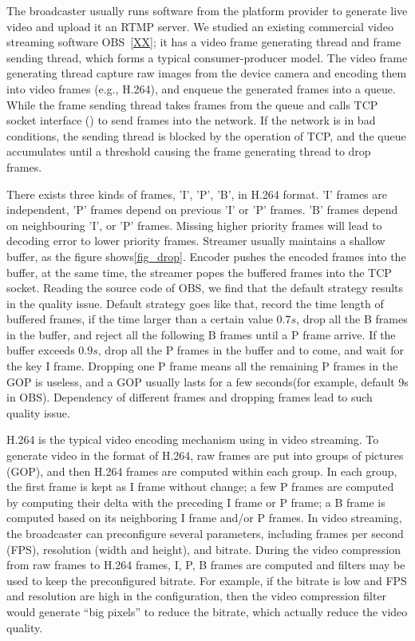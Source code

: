 \iffalse

The broadcaster usually runs software from the platform provider to generate live video and upload it an RTMP server. We studied an existing commercial video streaming software OBS~\ref{XX}; it has a video frame generating thread and frame sending thread, which forms a typical consumer-producer model. The video frame generating thread capture raw images from the device camera and encoding them into video frames (e.g., H.264), and enqueue the generated frames into a queue. While the frame sending thread takes frames from the queue and calls TCP socket interface (\mywrite) to send frames into the network. If the network is in bad conditions, the sending thread is blocked by the \mywrite operation of TCP, and the queue accumulates until a threshold causing the frame generating thread to drop frames.


There exists three kinds of frames, 'I', 'P', 'B', in H.264 format. 'I' frames are independent, 'P' frames depend on previous 'I' or 'P' frames. 'B' frames depend on neighbouring 'I', or 'P' frames. Missing higher priority frames will lead to decoding error to lower priority frames.
Streamer usually maintains a shallow buffer, as the figure shows\ref{fig_drop}. Encoder pushes the encoded frames into the buffer, at the same time, the streamer popes the buffered frames into the TCP socket. Reading the source code of OBS, we find that the default strategy results in the quality issue. Default strategy goes like that, record the time length of buffered frames, if the time larger than a certain value $0.7s$, drop all the B frames in the buffer, and reject all the following B frames until a P frame arrive. If the buffer exceeds $0.9s$, drop all the P frames in the buffer and to come, and wait for the key I frame. Dropping one P frame means all the remaining P frames in the GOP is useless, and a GOP usually lasts for a few seconds(for example, default 9s in OBS). Dependency of different frames and dropping frames lead to such quality issue.

H.264 is the typical video encoding mechanism using in video streaming. To generate video in the format of H.264, raw frames are put into groups of pictures (GOP), and then H.264 frames are computed within each group. In each group, the first frame is kept as I frame without change; a few P frames are computed by computing their delta with the preceding I frame or P frame; a B frame is computed based on its neighboring I frame and/or P frames. In video streaming, the broadcaster can preconfigure several parameters, including frames per second (FPS), resolution (width and height), and bitrate. During the video compression from raw frames to H.264 frames, I, P, B frames are computed and filters may be used to keep the preconfigured bitrate. For example, if the bitrate is low and FPS and resolution are high in the configuration, then the video compression filter would generate ``big pixels'' to reduce the bitrate, which actually reduce the video quality.

